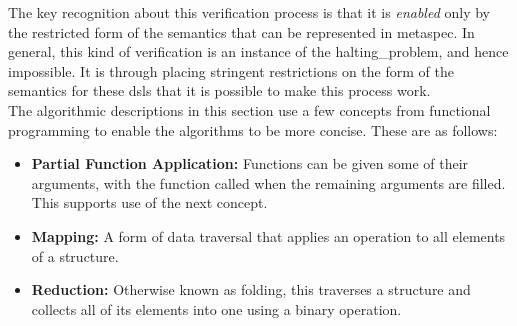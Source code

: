 The key recognition about this verification process is that it is \textit{enabled} only by the restricted form of the semantics that can be represented in \gls{metaspec}.
In general, this kind of verification is an instance of the \gls{halting_problem}, and hence impossible.
It is through placing stringent restrictions on the form of the semantics for these \glspl{dsl} that it is possible to make this process work. \\

The algorithmic descriptions in this section use a few concepts from functional programming to enable the algorithms to be more concise.
These are as follows:
\begin{itemize}
    \item \textbf{Partial Function Application:} Functions can be given some of their arguments, with the function called when the remaining arguments are filled.
    This supports use of the next concept.
    \item \textbf{Mapping:} A form of data traversal that applies an operation to all elements of a structure.
    \item \textbf{Reduction:} Otherwise known as folding, this traverses a structure and collects all of its elements into one using a binary operation. 
\end{itemize}

